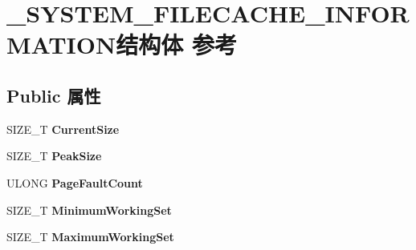 \hypertarget{struct___s_y_s_t_e_m___f_i_l_e_c_a_c_h_e___i_n_f_o_r_m_a_t_i_o_n}{}\section{\+\_\+\+S\+Y\+S\+T\+E\+M\+\_\+\+F\+I\+L\+E\+C\+A\+C\+H\+E\+\_\+\+I\+N\+F\+O\+R\+M\+A\+T\+I\+O\+N结构体 参考}
\label{struct___s_y_s_t_e_m___f_i_l_e_c_a_c_h_e___i_n_f_o_r_m_a_t_i_o_n}
\subsection*{Public 属性}
\begin{DoxyCompactItemize}
\item 
\mbox{\label{struct___s_y_s_t_e_m___f_i_l_e_c_a_c_h_e___i_n_f_o_r_m_a_t_i_o_n_a33ece3c945d332a996b60a404134432f}} 
S\+I\+Z\+E\+\_\+T {\bfseries Current\+Size}
\item 
\mbox{\label{struct___s_y_s_t_e_m___f_i_l_e_c_a_c_h_e___i_n_f_o_r_m_a_t_i_o_n_af6f901de78c64be3600a03f5a69739f9}} 
S\+I\+Z\+E\+\_\+T {\bfseries Peak\+Size}
\item 
\mbox{\label{struct___s_y_s_t_e_m___f_i_l_e_c_a_c_h_e___i_n_f_o_r_m_a_t_i_o_n_aff05ef221279ba7e98f3fe2dd476d5dc}} 
U\+L\+O\+NG {\bfseries Page\+Fault\+Count}
\item 
\mbox{\label{struct___s_y_s_t_e_m___f_i_l_e_c_a_c_h_e___i_n_f_o_r_m_a_t_i_o_n_a7f4286591cf2846c065af5fc24780486}} 
S\+I\+Z\+E\+\_\+T {\bfseries Minimum\+Working\+Set}
\item 
\mbox{\label{struct___s_y_s_t_e_m___f_i_l_e_c_a_c_h_e___i_n_f_o_r_m_a_t_i_o_n_a700b9cce9455d79a7a3da9aa2b5e9cfe}} 
S\+I\+Z\+E\+\_\+T {\bfseries Maximum\+Working\+Set}
\item 
\mbox{\label{struct___s_y_s_t_e_m___f_i_l_e_c_a_c_h_e___i_n_f_o_r_m_a_t_i_o_n_ad45eb850c963fcfb8e188a30a97c0a51}} 

\end{DoxyCompactItemize}
